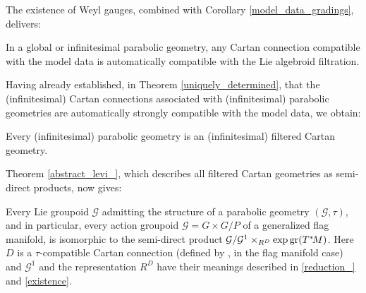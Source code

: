 \documentclass[leqno,12pt]{amsart} %
\begin{document}
The existence of Weyl gauges, combined with Corollary \ref{model_data_gradings}, delivers:
%
\begin{corollaryA}
  In a global or infinitesimal parabolic geometry, any Cartan connection compatible with
  the model data is automatically compatible with the Lie algebroid filtration.
\end{corollaryA}

Having already established, in Theorem \ref{uniquely_determined}, that the (infinitesimal)
Cartan connections associated with (infinitesimal) parabolic geometries are
automatically strongly compatible with the model data, we obtain:
%
\begin{corollaryB}
  Every (infinitesimal) parabolic geometry is an (infinitesimal) filtered Cartan geometry.
\end{corollaryB}
\noindent%
Theorem \ref{abstract_levi_}, which describes all filtered Cartan geometries as
semi-direct products, now gives:
%
\begin{corollaryC}
  Every Lie groupoid ${\mathcal G} $ admitting the structure of a parabolic geometry
  $({\mathcal G}, \tau)$, and in particular, every action groupoid
  ${\mathcal G} = G \times G/P$ of a generalized flag manifold, is isomorphic to the
  semi-direct product ${\mathcal G}/{\mathcal G}^1 \times_{R^D}\exp \operatorname{\operatorname{gr}}(T^*\!M)$. Here
  $D$ is a $\tau $-compatible Cartan connection (defined by , in
  the flag manifold case) and ${\mathcal G}^1$ and the representation $R^D$ have their
  meanings described in \ref{reduction_} and \ref{existence}.
\end{corollaryC}
\end{document}
